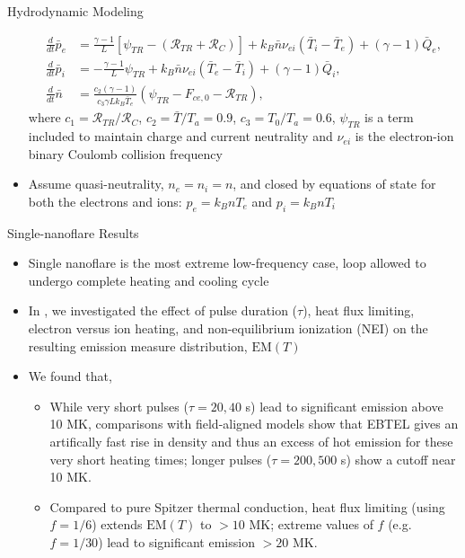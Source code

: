 \documentclass[final]{beamer}
\begin{document}
\begin{frame}
\begin{columns}[t]
\begin{column}{0.49\linewidth}
\begin{block}{Hydrodynamic Modeling}
\begin{itemize}
        \begin{align}
          \frac{d}{dt}\bar{p}_e &= \frac{\gamma - 1}{L}\left\lbrack\psi_{TR} - (\mathcal{R}_{TR} + \mathcal{R}_C)\right\rbrack + k_B\bar{n}\nu_{ei}(\bar{T}_i - \bar{T}_e) + (\gamma - 1)\bar{Q}_e,\label{eq:ebtel_pe} \\[0.5em]
		      \frac{d}{dt}\bar{p}_i &= -\frac{\gamma - 1}{L}\psi_{TR} + k_B\bar{n}\nu_{ei}(\bar{T}_e - \bar{T}_i) + (\gamma - 1)\bar{Q}_i,\label{eq:ebtel_pi}\\[0.5em]
		      \frac{d}{dt}\bar{n} &= \frac{c_2(\gamma - 1)}{c_3\gamma Lk_B\bar{T}_e}\left(\psi_{TR} - F_{ce,0} - \mathcal{R}_{TR}\right),\label{eq:ebtel_n}
        \end{align}
        where $c_1=\mathcal{R}_{TR}/\mathcal{R}_C$, $c_2=\bar{T}/T_a=0.9$, $c_3=T_0/T_a=0.6$, $\psi_{TR}$ is a term included to maintain charge and current neutrality and $\nu_{ei}$ is the electron-ion binary Coulomb collision frequency
        \item Assume quasi-neutrality, $n_e=n_i=n$, and closed by equations of state for both the electrons and ions: $p_e=k_BnT_e$ and $p_i=k_BnT_i$
      \end{itemize}
    \end{block}
    \begin{block}{Single-nanoflare Results}
      \begin{itemize}
        \item Single nanoflare is the most extreme low-frequency case, loop allowed to undergo complete heating and cooling cycle
        \item In \citet[submitted]{barnes_inference_2016}, we investigated the effect of pulse duration ($\tau$), heat flux limiting, electron versus ion heating, and non-equilibrium ionization (NEI) on the resulting emission measure distribution, $\mathrm{EM}(T)$
        \item We found that,
        \begin{itemize}
          \item While very short pulses ($\tau=20,40$ s) lead to significant emission above 10 MK, comparisons with field-aligned models \citep[e.g. HYDRAD,][]{bradshaw_influence_2013} show that EBTEL gives an artifically fast rise in density and thus an excess of hot emission for these very short heating times; longer pulses ($\tau=200,500$ s) show a cutoff near 10 MK.
          \item Compared to pure Spitzer thermal conduction, heat flux limiting (using $f=1/6$) extends $\mathrm{EM}(T)$ to $>10$ MK; extreme values of $f$ (e.g. $f=1/30$) lead to significant emission $>20$ MK.

\end{itemize}
\end{itemize}
\end{block}
\end{column}
\end{columns}
\end{frame}
\end{document}
